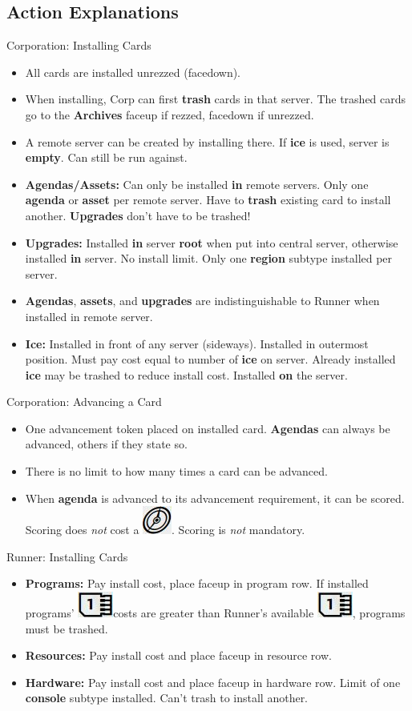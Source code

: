 \documentclass[12pt]{article}
\newenvironment{itemizeCustom}
{\begin{itemize}
  \setlength{\itemsep}{1pt}
  \setlength{\parskip}{0pt}
  \setlength{\parsep}{0pt}}
{\end{itemize}}
\newcommand{\action}{\includegraphics[scale=0.40]{images/actionLarge.jpg}\hspace{0.3em}}
\newcommand{\memoryUnit}{\includegraphics[scale=0.40]{images/memoryUnitLarge.jpg}\hspace{0.3em}}
\newcommand{\memoryUnitNoSpace}{\includegraphics[scale=0.40]{images/memoryUnitLarge.jpg}}
\begin{document}
\begin{multicols*}{2}
\section*{Action Explanations}
Corporation: Installing Cards
\begin{itemizeCustom}
	\item All cards are installed unrezzed (facedown).
	\item When installing, Corp can first \textbf{trash} cards in that server. The trashed cards go to the \textbf{Archives} faceup if rezzed, facedown if unrezzed.
	\item A remote server can be created by installing there. If \textbf{ice} is used, server is \textbf{empty}. Can still be run against.
	\item \textbf{Agendas/Assets:} Can only be installed \textbf{in} remote servers. Only one \textbf{agenda} or \textbf{asset} per remote server. Have to \textbf{trash} existing card to install another. \textbf{Upgrades} don't have to be trashed!
	\item \textbf{Upgrades:} Installed \textbf{in} server \textbf{root} when put into central server, otherwise installed \textbf{in} server. No install limit. Only one \textbf{region} subtype installed per server.
	\item \textbf{Agendas}, \textbf{assets}, and \textbf{upgrades} are indistinguishable to Runner when installed in remote server.
	\item \textbf{Ice:} Installed in front of any server (sideways). Installed in outermost position. Must pay cost equal to number of \textbf{ice} on server. Already installed \textbf{ice} may be trashed to reduce install cost. Installed \textbf{on} the server.
\end{itemizeCustom}

Corporation: Advancing a Card
\begin{itemizeCustom}
	\item One advancement token placed on installed card. \textbf{Agendas} can always be advanced, others if they state so.
	\item There is no limit to how many times a card can be advanced. 
	\item When \textbf{agenda} is advanced to its advancement requirement, it can be scored. Scoring does \emph{not} cost a \action. Scoring is \emph{not} mandatory.
\end{itemizeCustom}

Runner: Installing Cards
\begin{itemizeCustom}
	\item \textbf{Programs:} Pay install cost, place faceup in program row. If installed programs' \memoryUnit costs are greater than Runner's available \memoryUnitNoSpace, programs must be trashed.
	\item \textbf{Resources:} Pay install cost and place faceup in resource row.
	\item \textbf{Hardware:} Pay install cost and place faceup in hardware row. Limit of one \textbf{console} subtype installed. Can't trash to install another.
\end{itemizeCustom}


\end{multicols*}
\end{document}
